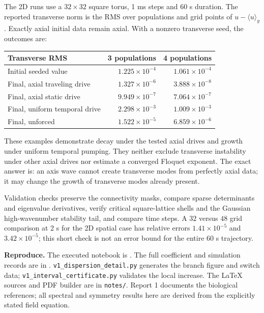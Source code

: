 \documentclass[11pt]{article}
\begin{document}
The 2D runs use a $32\times32$ square torus, 1 ms steps and 60 s duration.
The reported transverse norm is the RMS over populations and grid points of
$u-\langle u\rangle_y$. Exactly axial initial data remain axial. With a
nonzero transverse seed, the outcomes are:
\begin{center}\small
\begin{tabular}{lrr}\toprule
Transverse RMS&3 populations&4 populations\\\midrule
Initial seeded value&$1.225\times10^{-4}$&$1.061\times10^{-4}$\\
Final, axial traveling drive&$1.327\times10^{-6}$&$3.888\times10^{-8}$\\
Final, axial static drive&$9.949\times10^{-7}$&$7.064\times10^{-7}$\\
Final, uniform temporal drive&$2.298\times10^{-3}$&$1.009\times10^{-3}$\\
Final, unforced&$1.522\times10^{-5}$&$6.859\times10^{-6}$\\\bottomrule
\end{tabular}
\end{center}
These examples demonstrate decay under the tested axial drives and growth
under uniform temporal pumping. They neither exclude transverse instability
under other axial drives nor estimate a converged Floquet exponent. The exact
answer is: an axis wave cannot create transverse modes from perfectly axial
data; it may change the growth of transverse modes already present.

Validation checks preserve the connectivity masks, compare sparse determinants
and eigenvalue derivatives, verify critical square-lattice shells and the
Gaussian high-wavenumber stability tail, and compare time steps.
A $32$ versus $48$ grid comparison at 2 s for the 2D spatial case has relative
errors $1.41\times10^{-5}$ and $3.42\times10^{-5}$; this short check is not
an error bound for the entire 60 s trajectory.

\begingroup\small\raggedright
\textbf{Reproduce.} The executed notebook is
.
The full coefficient and simulation records are in
.
\texttt{v1\_dispersion\_detail.py} generates the branch figure and switch data;
\texttt{v1\_interval\_certificate.py} validates the local increase.
The LaTeX sources and PDF builder are in \texttt{notes/}. Report 1 documents
the biological references; all spectral and symmetry results here are derived
from the explicitly stated field equation.
\par\endgroup
\end{document}
